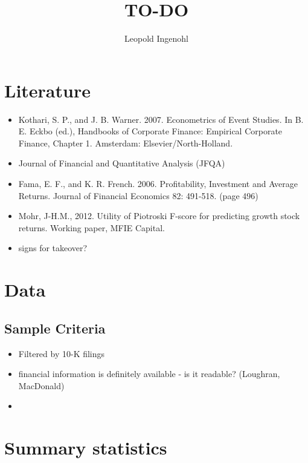 \documentclass[12pt]{article}
\title{TO-DO}
\author{Leopold Ingenohl}
\begin{document}
\maketitle

\section{Literature}
\begin{itemize}
   \item Kothari, S. P., and J. B. Warner. 2007. Econometrics of Event Studies. In B. E. Eckbo (ed.), Handbooks of Corporate Finance: Empirical Corporate Finance, Chapter 1. Amsterdam: Elsevier/North-Holland.
   \item Journal of Financial and Quantitative Analysis (JFQA)
   \item Fama, E. F., and K. R. French. 2006. Profitability, Investment and Average Returns. Journal of Financial Economics 82: 491-518. (page 496)
   \item Mohr, J-H.M., 2012. Utility of Piotroski F-score for predicting growth stock returns. Working paper, MFIE Capital.
   \item signs for takeover? 
   

\end{itemize}

\section{Data}
\subsection{Sample Criteria}
\begin{itemize}
    \item Filtered by 10-K filings
    \item financial information is definitely available - is it readable? (Loughran, MacDonald)
    \item 
\end{itemize}
\section{Summary statistics}
\end{document}
